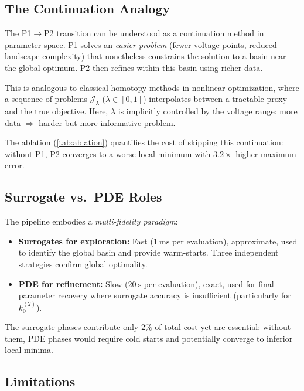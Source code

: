 \documentclass[11pt,a4paper]{article}
\newcommand{\kzero}{k_0}
\newcommand{\Jobj}{\mathcal{J}}
\begin{document}
\subsection{The Continuation Analogy}\label{sec:cont_analogy}

The P1$\to$P2 transition can be understood as a continuation method in
parameter space. P1 solves an \emph{easier problem} (fewer voltage
points, reduced landscape complexity) that nonetheless constrains the
solution to a basin near the global optimum. P2 then refines within this
basin using richer data.

This is analogous to classical homotopy methods in nonlinear optimization,
where a sequence of problems $\Jobj_\lambda$ ($\lambda \in [0,1]$)
interpolates between a tractable proxy and the true objective. Here,
$\lambda$ is implicitly controlled by the voltage range: more data
$\Rightarrow$ harder but more informative problem.

The ablation (\cref{tab:ablation}) quantifies the cost of skipping this
continuation: without P1, P2 converges to a worse local minimum with
$3.2\times$ higher maximum error.

\subsection{Surrogate vs.\ PDE Roles}\label{sec:roles}

The pipeline embodies a \emph{multi-fidelity paradigm}:
\begin{itemize}
  \item \textbf{Surrogates for exploration:} Fast ($\SI{1}{\milli\second}$
    per evaluation), approximate, used to identify the global basin and
    provide warm-starts. Three independent strategies confirm global
    optimality.
  \item \textbf{PDE for refinement:} Slow ($\SI{20}{\second}$ per
    evaluation), exact, used for final parameter recovery where surrogate
    accuracy is insufficient (particularly for $\kzero^{(2)}$).
\end{itemize}

The surrogate phases contribute only $2\%$ of total cost yet are
essential: without them, PDE phases would require cold starts and
potentially converge to inferior local minima.

\subsection{Limitations}\label{sec:limitations}
\end{document}
